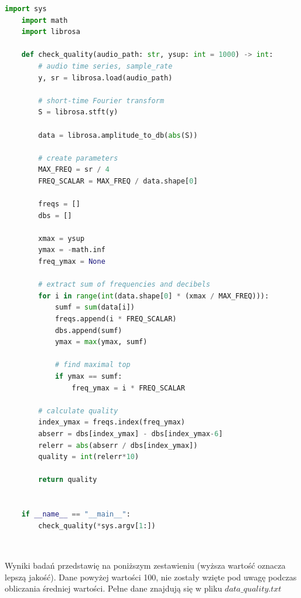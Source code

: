 \documentclass[a4paper,12pt]{extarticle}
\begin{document}
\begingroup
    \fontsize{9pt}{11pt}\selectfont
    \begin{lstlisting}[language=Python]
    import sys
    import math
    import librosa
    
    def check_quality(audio_path: str, ysup: int = 1000) -> int:
        # audio time series, sample_rate
        y, sr = librosa.load(audio_path)
    
        # short-time Fourier transform
        S = librosa.stft(y)
    
        data = librosa.amplitude_to_db(abs(S))
    
        # create parameters
        MAX_FREQ = sr / 4
        FREQ_SCALAR = MAX_FREQ / data.shape[0]
    
        freqs = []
        dbs = []
    
        xmax = ysup
        ymax = -math.inf
        freq_ymax = None
    
        # extract sum of frequencies and decibels
        for i in range(int(data.shape[0] * (xmax / MAX_FREQ))):
            sumf = sum(data[i])
            freqs.append(i * FREQ_SCALAR)
            dbs.append(sumf)
            ymax = max(ymax, sumf)
    
            # find maximal top
            if ymax == sumf:
                freq_ymax = i * FREQ_SCALAR
    
        # calculate quality
        index_ymax = freqs.index(freq_ymax)
        abserr = dbs[index_ymax] - dbs[index_ymax-6]
        relerr = abs(abserr / dbs[index_ymax])
        quality = int(relerr*10)
        
        return quality
    
    
    if __name__ == "__main__":
        check_quality(*sys.argv[1:])
    
    \end{lstlisting}
\endgroup

\newpage

\subsection*{}
Wyniki badań przedstawię na poniższym zestawieniu (wyższa wartość oznacza lepszą jakość). Dane powyżej wartości 100, nie zostały wzięte pod uwagę podczas obliczania średniej wartości. Pełne dane znajdują się w pliku $data\_quality.txt$
\end{document}
